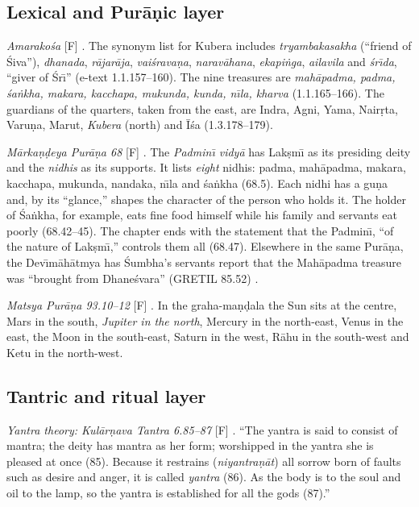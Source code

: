 \documentclass[journal]{IEEEtran}
\theoremstyle{definition}
\newcommand{\Fact}{\textsf{[F]}}
\begin{document}
\subsection{Lexical and Pur\=a\d nic layer}
\emph{Amarako\'sa} \Fact{} \cite{gretil_amara}. The synonym list for Kubera includes \emph{tryambakasakha} (``friend of \'Siva''), \emph{dhanada}, \emph{r\=ajar\=aja}, \emph{vai\'srava\d na}, \emph{naravāhana}, \emph{ekapi\.nga}, \emph{ailavila} and \emph{\'sr\=\i da}, ``giver of \'Sr\=\i'' (e-text 1.1.157--160). The nine treasures are \emph{mah\=apadma, padma, \'sa\.nkha, makara, kacchapa, mukunda, kunda, n\=\i la, kharva} (1.1.165--166). The guardians of the quarters, taken from the east, are Indra, Agni, Yama, Nair\d rta, Varu\d na, Marut, \emph{Kubera} (north) and \=I\'sa (1.3.178--179).

\emph{M\=arka\d n\d deya Pur\=a\d na 68} \Fact{} \cite{dutt1896mkp,els_mkp68}. The \emph{Padmin\=\i{} vidy\=a} has Lak\d sm\=\i{} as its presiding deity and the \emph{nidhis} as its supports. It lists \emph{eight} nidhis: padma, mah\=apadma, makara, kacchapa, mukunda, nandaka, n\=\i la and \'sa\.nkha (68.5). Each nidhi has a gu\d na and, by its ``glance,'' shapes the character of the person who holds it. The holder of \'Sa\.nkha, for example, eats fine food himself while his family and servants eat poorly (68.42--45). The chapter ends with the statement that the Padmin\=\i{}, ``of the nature of Lak\d sm\=\i,'' controls them all (68.47). Elsewhere in the same Pur\=a\d na, the Dev\=\i m\=ah\=atmya has \'Sumbha's servants report that the Mah\=apadma treasure was ``brought from Dhane\'svara'' (GRETIL 85.52) \cite{gretil_mkp}.

\emph{Matsya Pur\=a\d na 93.10--12} \Fact{} \cite{gretil_matsya}. In the graha-maṇḍala the Sun sits at the centre, Mars in the south, \emph{Jupiter in the north}, Mercury in the north-east, Venus in the east, the Moon in the south-east, Saturn in the west, R\=ahu in the south-west and Ketu in the north-west.

\subsection{Tantric and ritual layer}
\emph{Yantra theory: Kul\=ar\d nava Tantra 6.85--87} \Fact{} \cite{kularnava1917}. ``The yantra is said to consist of mantra; the deity has mantra as her form; worshipped in the yantra she is pleased at once (85). Because it restrains (\emph{niyantra\d n\=at}) all sorrow born of faults such as desire and anger, it is called \emph{yantra} (86). As the body is to the soul and oil to the lamp, so the yantra is established for all the gods (87).''
\end{document}
